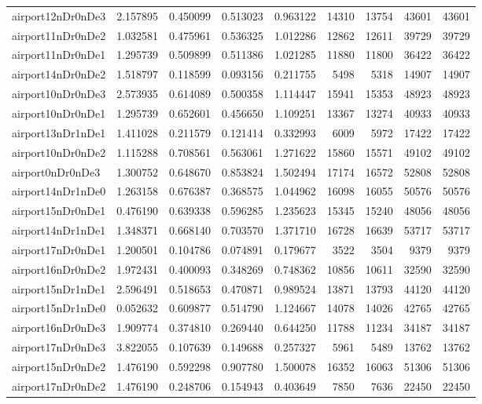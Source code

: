 \begin{longtable}{|l|r|r|r|r|r|r|r|r|}
airport12nDr0nDe3 & 2.157895 & 0.450099 & 0.513023 & 0.963122 & 14310 & 13754 & 43601 & 43601 \\
airport11nDr0nDe2 & 1.032581 & 0.475961 & 0.536325 & 1.012286 & 12862 & 12611 & 39729 & 39729 \\
airport11nDr0nDe1 & 1.295739 & 0.509899 & 0.511386 & 1.021285 & 11880 & 11800 & 36422 & 36422 \\
airport14nDr0nDe2 & 1.518797 & 0.118599 & 0.093156 & 0.211755 & 5498 & 5318 & 14907 & 14907 \\
airport10nDr0nDe3 & 2.573935 & 0.614089 & 0.500358 & 1.114447 & 15941 & 15353 & 48923 & 48923 \\
airport10nDr0nDe1 & 1.295739 & 0.652601 & 0.456650 & 1.109251 & 13367 & 13274 & 40933 & 40933 \\
airport13nDr1nDe1 & 1.411028 & 0.211579 & 0.121414 & 0.332993 & 6009 & 5972 & 17422 & 17422 \\
airport10nDr0nDe2 & 1.115288 & 0.708561 & 0.563061 & 1.271622 & 15860 & 15571 & 49102 & 49102 \\
airport0nDr0nDe3 & 1.300752 & 0.648670 & 0.853824 & 1.502494 & 17174 & 16572 & 52808 & 52808 \\
airport14nDr1nDe0 & 1.263158 & 0.676387 & 0.368575 & 1.044962 & 16098 & 16055 & 50576 & 50576 \\
airport15nDr0nDe1 & 0.476190 & 0.639338 & 0.596285 & 1.235623 & 15345 & 15240 & 48056 & 48056 \\
airport14nDr1nDe1 & 1.348371 & 0.668140 & 0.703570 & 1.371710 & 16728 & 16639 & 53717 & 53717 \\
airport17nDr0nDe1 & 1.200501 & 0.104786 & 0.074891 & 0.179677 & 3522 & 3504 & 9379 & 9379 \\
airport16nDr0nDe2 & 1.972431 & 0.400093 & 0.348269 & 0.748362 & 10856 & 10611 & 32590 & 32590 \\
airport15nDr1nDe1 & 2.596491 & 0.518653 & 0.470871 & 0.989524 & 13871 & 13793 & 44120 & 44120 \\
airport15nDr1nDe0 & 0.052632 & 0.609877 & 0.514790 & 1.124667 & 14078 & 14026 & 42765 & 42765 \\
airport16nDr0nDe3 & 1.909774 & 0.374810 & 0.269440 & 0.644250 & 11788 & 11234 & 34187 & 34187 \\
airport17nDr0nDe3 & 3.822055 & 0.107639 & 0.149688 & 0.257327 & 5961 & 5489 & 13762 & 13762 \\
airport15nDr0nDe2 & 1.476190 & 0.592298 & 0.907780 & 1.500078 & 16352 & 16063 & 51306 & 51306 \\
airport17nDr0nDe2 & 1.476190 & 0.248706 & 0.154943 & 0.403649 & 7850 & 7636 & 22450 & 22450 \\

\end{longtable}
